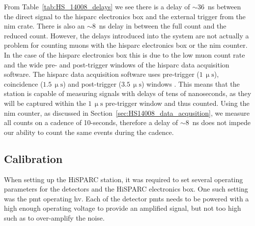 
From Table~\ref{tab:HS_14008_delays} we see there is a delay of $\sim36$~ns between the direct signal to the \gls{hisparc} electronics box and the external trigger from the \gls{nim} crate. There is also an $\sim8$~ns delay in between the full count and the reduced count. However, the delays introduced into the system are not actually a problem for counting muons with the \gls{hisparc} electronics box or the \gls{nim} counter. In the case of the \gls{hisparc} electronics box this is due to the low muon count rate and the wide pre- and post-trigger windows of the \gls{hisparc} data acquisition software. The \gls{hisparc} data acquisition software uses pre-trigger ($1\,\upmu\mathrm{s}$), coincidence ($1.5\,\upmu\mathrm{s}$) and post-trigger ($3.5\,\upmu\mathrm{s}$) windows \citep{fokkema_hisparc_2012}. This means that the station is capable of measuring signals with delays of tens of nanoseconds, as they will be captured within the $1\,\upmu\mathrm{s}$ pre-trigger window and thus counted. Using the \gls{nim} counter, as discussed in Section~\ref{sec:HS14008_data_acqusition}, we measure all counts on a cadence of 10-seconds, therefore a delay of $\sim8$~ns does not impede our ability to count the same events during the cadence.


\subsection{Calibration}

When setting up the HiSPARC station, it was required to set several operating parameters for the detectors and the HiSPARC electronics box. One such setting was the \gls{pmt} operating \gls{hv}. Each of the detector \glspl{pmt} needs to be powered with a high enough operating voltage to provide an amplified signal, but not too high such as to over-amplify the noise.

